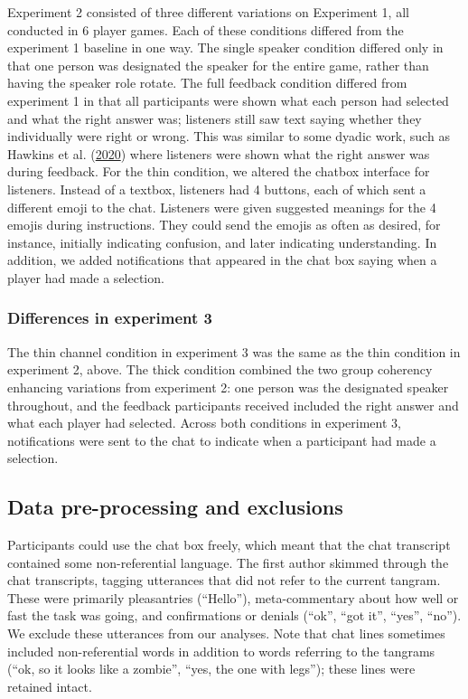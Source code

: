 \documentclass[
  english,
  a4paper,
]{article}
\begin{document}
Experiment 2 consisted of three different variations on Experiment 1, all conducted in 6 player games. Each of these conditions differed from the experiment 1 baseline in one way. The single speaker condition differed only in that one person was designated the speaker for the entire game, rather than having the speaker role rotate. The full feedback condition differed from experiment 1 in that all participants were shown what each person had selected and what the right answer was; listeners still saw text saying whether they individually were right or wrong. This was similar to some dyadic work, such as Hawkins et al. (\protect\hyperlink{ref-hawkinsCharacterizingDynamicsLearning2020}{2020}) where listeners were shown what the right answer was during feedback. For the thin condition, we altered the chatbox interface for listeners. Instead of a textbox, listeners had 4 buttons, each of which sent a different emoji to the chat. Listeners were given suggested meanings for the 4 emojis during instructions. They could send the emojis as often as desired, for instance, initially indicating confusion, and later indicating understanding. In addition, we added notifications that appeared in the chat box saying when a player had made a selection.

\hypertarget{differences-in-experiment-3}{%
\subsubsection{Differences in experiment 3}\label{differences-in-experiment-3}}

The thin channel condition in experiment 3 was the same as the thin condition in experiment 2, above. The thick condition combined the two group coherency enhancing variations from experiment 2: one person was the designated speaker throughout, and the feedback participants received included the right answer and what each player had selected. Across both conditions in experiment 3, notifications were sent to the chat to indicate when a participant had made a selection.

\hypertarget{data-pre-processing-and-exclusions}{%
\subsection{Data pre-processing and exclusions}\label{data-pre-processing-and-exclusions}}

Participants could use the chat box freely, which meant that the chat transcript contained some non-referential language. The first author skimmed through the chat transcripts, tagging utterances that did not refer to the current tangram. These were primarily pleasantries (``Hello''), meta-commentary about how well or fast the task was going, and confirmations or denials (``ok'', ``got it'', ``yes'', ``no''). We exclude these utterances from our analyses. Note that chat lines sometimes included non-referential words in addition to words referring to the tangrams (``ok, so it looks like a zombie'', ``yes, the one with legs''); these lines were retained intact.
\end{document}
